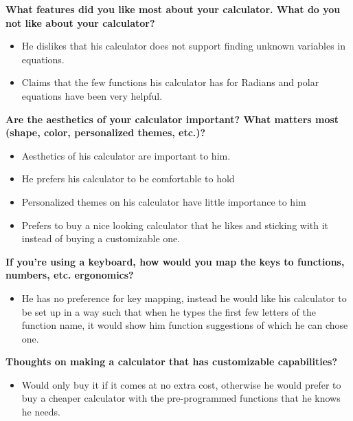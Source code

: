 \documentclass{article}
\begin{document}
\textbf{What features did you like most about your calculator. What do you not like about your calculator?}
\begin{itemize}
\itemsep0em 
\item He dislikes that his calculator does not support finding unknown variables in equations.
\item Claims that the few functions his calculator has for Radians and polar equations have been very helpful.
\end{itemize}

\textbf{Are the aesthetics of your calculator important? What matters most (shape, color,  personalized themes, etc.)?}
\begin{itemize}
\itemsep0em 
\item Aesthetics of his calculator are important to him.
\item He prefers his calculator to be comfortable to hold 
\item Personalized themes on his calculator have little importance to him
\item Prefers to buy a nice looking calculator that he likes and sticking with it instead of buying a customizable one.
\end{itemize}

\textbf{If you’re using a keyboard, how would you map the keys to functions, numbers, etc. ergonomics?}
\begin{itemize}
\itemsep0em 
\item He has no preference for key mapping, instead he would like his calculator to be set up in a way such that when he types the first few letters of the function name, it would show him function suggestions of which he can chose one.
\end{itemize}

\textbf{Thoughts on making a calculator that has customizable capabilities? }
\begin{itemize}
\itemsep0em 
\item Would only buy it if it comes at no extra cost, otherwise he would prefer to buy a cheaper calculator with the pre-programmed functions that he knows he needs.
\end{itemize}
\pagebreak
\end{document}

